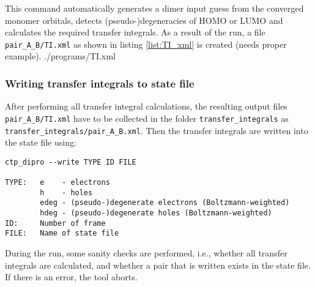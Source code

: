This command automatically generates a dimer input guess from the converged monomer orbitals, detects (pseudo-)degeneracies of HOMO or LUMO and calculates the required transfer integrals. As a result of the run, a file {\tt pair\_A\_B/TI.xml} as shown in listing \ref{list:TI_xml} is created (needs proper example).
 {./programs/TI.xml}

\subsubsection{Writing transfer integrals to state file}
After performing all transfer integral calculations, the resulting output files {\tt pair\_A\_B/TI.xml} have to be collected in the folder {\tt transfer\_integrals} as {\tt transfer\_integrals/pair\_A\_B.xml}. Then the transfer integrals are written into the state file using:
\begin{verbatim}
ctp_dipro --write TYPE ID FILE

TYPE:   e    - electrons
        h    - holes
        edeg - (pseudo-)degenerate electrons (Boltzmann-weighted)
        hdeg - (pseudo-)degenerate holes (Boltzmann-weighted)
ID:     Number of frame
FILE:   Name of state file 
\end{verbatim}
During the run, some sanity checks are performed, i.e., whether all transfer integrals are calculated, and whether a pair that is written exists in the state file. If there is an error, the tool aborts.
